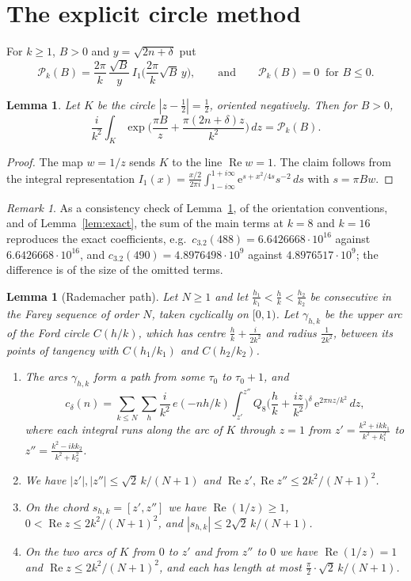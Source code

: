 \documentclass[11pt]{amsart}
\newtheorem{lemma}[theorem]{Lemma}
\theoremstyle{remark}
\newtheorem{remark}[theorem]{Remark}
\theoremstyle{definition}
\newcommand{\cP}{\mathcal P}
\newcommand{\Rea}{\operatorname{Re}}
\newcommand{\e}{\mathrm e}
\begin{document}
\section{The explicit circle method}\label{sec:circle}

For $k\ge1$, $B>0$ and $y=\sqrt{2n+\delta}$ put
\[
\cP_k(B)=\frac{2\pi}k\,\frac{\sqrt B}{y}\,I_1\Big(\frac{2\pi}k\sqrt B\,y\Big),\qquad\text{and}\qquad \cP_k(B)=0\ \text{ for } B\le0 .
\]

\begin{lemma}\label{lem:bessel}
Let $K$ be the circle $|z-\frac12|=\frac12$, oriented negatively. Then for $B>0$,
\[
\frac i{k^2}\int_K\exp\Big(\frac{\pi B}z+\frac{\pi(2n+\delta)z}{k^2}\Big)\,dz=\cP_k(B).
\]
\end{lemma}

\begin{proof}
The map $w=1/z$ sends $K$ to the line $\Rea w=1$. The claim follows from the integral representation $I_1(x)=\frac{x/2}{2\pi i}\int_{1-i\infty}^{1+i\infty}\e^{s+x^2/4s}s^{-2}\,ds$ with $s=\pi Bw$.
\end{proof}

\begin{remark}
As a consistency check of Lemma~\ref{lem:bessel}, of the orientation conventions, and of Lemma~\ref{lem:exact}, the sum of the main terms at $k=8$ and $k=16$ reproduces the exact coefficients, e.g.\ $c_{3.2}(488)=6.6426668\cdot10^{16}$ against $6.6426668\cdot10^{16}$, and $c_{3.2}(490)=4.8976498\cdot10^{9}$ against $4.8976517\cdot10^{9}$; the difference is of the size of the omitted terms.
\end{remark}

\begin{lemma}[Rademacher path]\label{lem:farey}
Let $N\ge1$ and let $\frac{h_1}{k_1}<\frac hk<\frac{h_2}{k_2}$ be consecutive in the Farey sequence of order $N$, taken cyclically on $[0,1)$. Let $\gamma_{h,k}$ be the upper arc of the Ford circle $C(h/k)$, which has centre $\frac hk+\frac i{2k^2}$ and radius $\frac1{2k^2}$, between its points of tangency with $C(h_1/k_1)$ and $C(h_2/k_2)$.
\begin{enumerate}[label=(\alph*),leftmargin=2em]
\item The arcs $\gamma_{h,k}$ form a path from some $\tau_0$ to $\tau_0+1$, and
\[
c_\delta(n)=\sum_{k\le N}\sum_h\frac i{k^2}\,e(-nh/k)\int_{z'}^{z''}Q_8\Big(\frac hk+\frac{iz}{k^2}\Big)^\delta\,\e^{2\pi nz/k^2}\,dz,
\]
where each integral runs along the arc of $K$ through $z=1$ from $z'=\frac{k^2+ikk_1}{k^2+k_1^2}$ to $z''=\frac{k^2-ikk_2}{k^2+k_2^2}$.
\item We have $|z'|,|z''|\le\sqrt2\,k/(N+1)$ and $\Rea z',\Rea z''\le2k^2/(N+1)^2$.
\item On the chord $s_{h,k}=[z',z'']$ we have $\Rea(1/z)\ge1$, $0<\Rea z\le2k^2/(N+1)^2$, and $|s_{h,k}|\le2\sqrt2\,k/(N+1)$.
\item On the two arcs of $K$ from $0$ to $z'$ and from $z''$ to $0$ we have $\Rea(1/z)=1$ and $\Rea z\le2k^2/(N+1)^2$, and each has length at most $\frac\pi2\cdot\sqrt2\,k/(N+1)$.
\end{enumerate}
\end{lemma}
\end{document}
